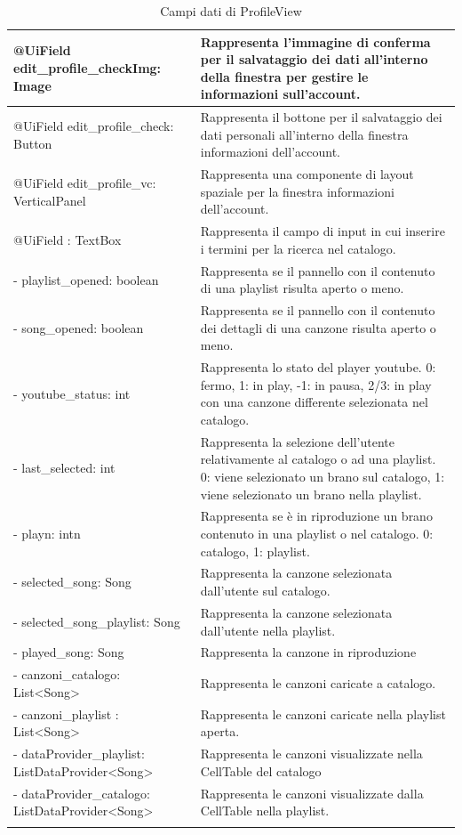 \begin{longtable}{|p{}|p{}|}
@UiField edit\_profile\_checkImg: Image & Rappresenta l'immagine di
conferma per il salvataggio dei dati all'interno della finestra per
gestire le informazioni sull'account.\\\hline
@UiField edit\_profile\_check: Button & Rappresenta il bottone per il
salvataggio dei dati personali all'interno della finestra informazioni
dell'account.\\\hline
@UiField edit\_profile\_vc: VerticalPanel & Rappresenta una componente di layout
spaziale per la finestra informazioni dell'account.\\\hline
@UiField : TextBox & Rappresenta il campo di input in cui inserire i
termini per la ricerca nel catalogo.\\\hline
- playlist\_opened: boolean & Rappresenta se il pannello con il contenuto di una
playlist risulta aperto o meno. \\\hline
- song\_opened: boolean & Rappresenta se il pannello con il contenuto dei
dettagli di una canzone risulta aperto o meno. \\\hline
- youtube\_status: int & Rappresenta lo stato del player youtube. 0: fermo, 1:
in play, -1: in pausa, 2/3: in play con una canzone differente selezionata nel
catalogo. \\\hline
- last\_selected: int & Rappresenta la selezione dell'utente relativamente al
catalogo o ad una playlist. 0: viene selezionato un brano sul catalogo, 1: viene
selezionato un brano nella playlist. \\\hline
- playn: intn & Rappresenta se \`e in riproduzione un brano contenuto in una
playlist o nel catalogo. 0: catalogo, 1: playlist. \\\hline
- selected\_song: Song & Rappresenta la canzone selezionata dall'utente sul
catalogo. \\\hline
- selected\_song\_playlist: Song & Rappresenta la canzone selezionata
dall'utente nella playlist.\\\hline
- played\_song: Song & Rappresenta la canzone in riproduzione\\\hline
- canzoni\_catalogo: List\textless Song\textgreater & Rappresenta le
canzoni caricate a catalogo.\\\hline
- canzoni\_playlist : List\textless Song\textgreater & Rappresenta le
canzoni caricate nella playlist aperta.\\\hline - dataProvider\_playlist:
ListDataProvider\textless Song\textgreater & Rappresenta le canzoni
visualizzate nella CellTable del catalogo\\\hline - dataProvider\_catalogo:
ListDataProvider\textless Song\textgreater & Rappresenta le canzoni visualizzate
dalla CellTable nella playlist.\\\hline
\caption{Campi dati di ProfileView}
\end{longtable}
